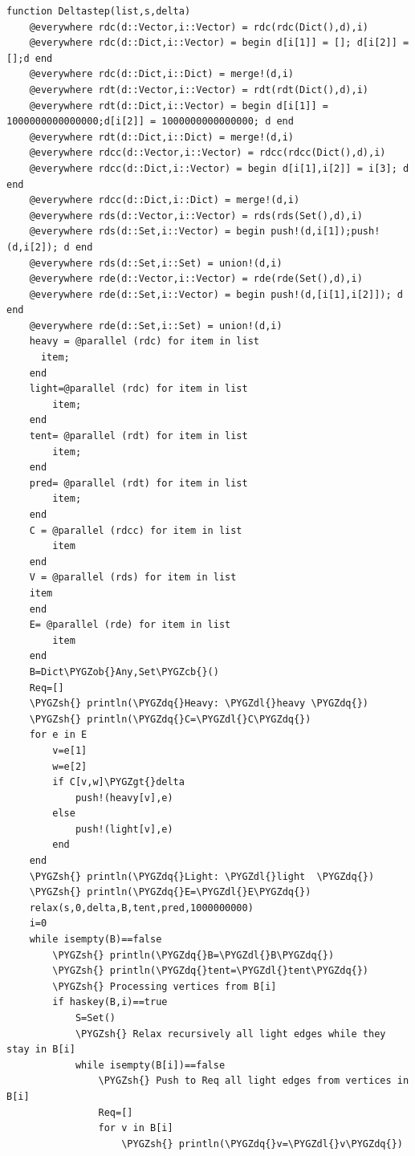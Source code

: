 \documentclass[letterpaper,10pt,english]{sphinxmanual}
\def\PYGZob{\char`\{}
\def\PYGZcb{\char`\}}
\def\PYGZgt{\char`\>}
\def\PYGZsh{\char`\#}
\def\PYGZdl{\char`\$}
\def\PYGZdq{\char`\"}
\begin{document}
\begin{Verbatim}[commandchars=\\\{\}]
function Deltastep(list,s,delta)
    @everywhere rdc(d::Vector,i::Vector) = rdc(rdc(Dict(),d),i)
    @everywhere rdc(d::Dict,i::Vector) = begin d[i[1]] = []; d[i[2]] = [];d end
    @everywhere rdc(d::Dict,i::Dict) = merge!(d,i)
    @everywhere rdt(d::Vector,i::Vector) = rdt(rdt(Dict(),d),i)
    @everywhere rdt(d::Dict,i::Vector) = begin d[i[1]] = 1000000000000000;d[i[2]] = 1000000000000000; d end
    @everywhere rdt(d::Dict,i::Dict) = merge!(d,i)
    @everywhere rdcc(d::Vector,i::Vector) = rdcc(rdcc(Dict(),d),i)
    @everywhere rdcc(d::Dict,i::Vector) = begin d[i[1],i[2]] = i[3]; d end
    @everywhere rdcc(d::Dict,i::Dict) = merge!(d,i)
    @everywhere rds(d::Vector,i::Vector) = rds(rds(Set(),d),i)
    @everywhere rds(d::Set,i::Vector) = begin push!(d,i[1]);push!(d,i[2]); d end
    @everywhere rds(d::Set,i::Set) = union!(d,i)
    @everywhere rde(d::Vector,i::Vector) = rde(rde(Set(),d),i)
    @everywhere rde(d::Set,i::Vector) = begin push!(d,[i[1],i[2]]); d end
    @everywhere rde(d::Set,i::Set) = union!(d,i)
    heavy = @parallel (rdc) for item in list
      item;
    end
    light=@parallel (rdc) for item in list
        item;
    end
    tent= @parallel (rdt) for item in list
        item;
    end
    pred= @parallel (rdt) for item in list
        item;
    end
    C = @parallel (rdcc) for item in list
        item
    end
    V = @parallel (rds) for item in list
    item
    end
    E= @parallel (rde) for item in list
        item
    end
    B=Dict\PYGZob{}Any,Set\PYGZcb{}()
    Req=[]
    \PYGZsh{} println(\PYGZdq{}Heavy: \PYGZdl{}heavy \PYGZdq{})
    \PYGZsh{} println(\PYGZdq{}C=\PYGZdl{}C\PYGZdq{})
    for e in E
        v=e[1]
        w=e[2]
        if C[v,w]\PYGZgt{}delta
            push!(heavy[v],e)
        else
            push!(light[v],e)
        end
    end
    \PYGZsh{} println(\PYGZdq{}Light: \PYGZdl{}light  \PYGZdq{})
    \PYGZsh{} println(\PYGZdq{}E=\PYGZdl{}E\PYGZdq{})
    relax(s,0,delta,B,tent,pred,1000000000)
    i=0
    while isempty(B)==false
        \PYGZsh{} println(\PYGZdq{}B=\PYGZdl{}B\PYGZdq{})
        \PYGZsh{} println(\PYGZdq{}tent=\PYGZdl{}tent\PYGZdq{})
        \PYGZsh{} Processing vertices from B[i]
        if haskey(B,i)==true
            S=Set()
            \PYGZsh{} Relax recursively all light edges while they stay in B[i]
            while isempty(B[i])==false
                \PYGZsh{} Push to Req all light edges from vertices in B[i]
                Req=[]
                for v in B[i]
                    \PYGZsh{} println(\PYGZdq{}v=\PYGZdl{}v\PYGZdq{})

\end{Verbatim}
\end{document}
